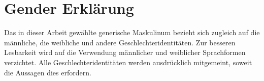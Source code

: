 \section*{Gender Erklärung} %
    Das in dieser Arbeit gewählte generische Maskulinum bezieht sich zugleich auf die männliche, die weibliche und andere Geschlechteridentitäten. Zur besseren Lesbarkeit wird auf die Verwendung männlicher und weiblicher Sprachformen verzichtet. Alle Geschlechteridentitäten werden ausdrücklich mitgemeint, soweit die Aussagen dies erfordern.
    